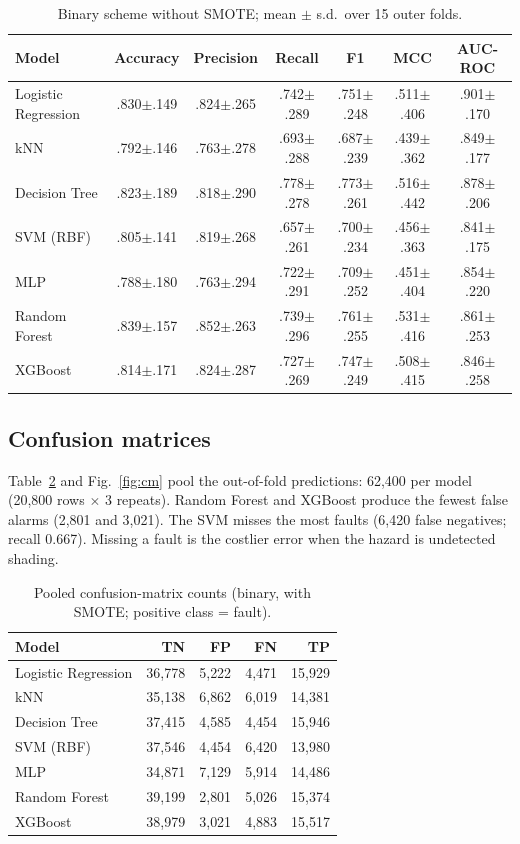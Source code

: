 \documentclass[11pt,a4paper]{article}
\begin{document}
\begin{table}[t]
\centering
\caption{Binary scheme without SMOTE; mean $\pm$ s.d.\ over 15 outer folds.}
\label{tab:nosmote}
\small
\begin{tabular}{@{}lcccccc@{}}
\toprule
Model & Accuracy & Precision & Recall & F1 & MCC & AUC-ROC \\
\midrule
Logistic Regression & .830$\pm$.149 & .824$\pm$.265 & .742$\pm$.289 & .751$\pm$.248 & .511$\pm$.406 & .901$\pm$.170 \\
kNN & .792$\pm$.146 & .763$\pm$.278 & .693$\pm$.288 & .687$\pm$.239 & .439$\pm$.362 & .849$\pm$.177 \\
Decision Tree & .823$\pm$.189 & .818$\pm$.290 & .778$\pm$.278 & .773$\pm$.261 & .516$\pm$.442 & .878$\pm$.206 \\
SVM (RBF) & .805$\pm$.141 & .819$\pm$.268 & .657$\pm$.261 & .700$\pm$.234 & .456$\pm$.363 & .841$\pm$.175 \\
MLP & .788$\pm$.180 & .763$\pm$.294 & .722$\pm$.291 & .709$\pm$.252 & .451$\pm$.404 & .854$\pm$.220 \\
Random Forest & .839$\pm$.157 & .852$\pm$.263 & .739$\pm$.296 & .761$\pm$.255 & .531$\pm$.416 & .861$\pm$.253 \\
XGBoost & .814$\pm$.171 & .824$\pm$.287 & .727$\pm$.269 & .747$\pm$.249 & .508$\pm$.415 & .846$\pm$.258 \\
\bottomrule
\end{tabular}
\end{table}

\subsection{Confusion matrices}

Table~\ref{tab:cm} and Fig.~\ref{fig:cm} pool the out-of-fold predictions: 62{,}400 per model (20{,}800 rows $\times$ 3 repeats). Random Forest and XGBoost produce the fewest false alarms (2{,}801 and 3{,}021). The SVM misses the most faults (6{,}420 false negatives; recall 0.667). Missing a fault is the costlier error when the hazard is undetected shading.

\begin{table}[t]
\centering
\caption{Pooled confusion-matrix counts (binary, with SMOTE; positive class = fault).}
\label{tab:cm}
\small
\begin{tabular}{@{}lrrrr@{}}
\toprule
Model & TN & FP & FN & TP \\
\midrule
Logistic Regression & 36{,}778 & 5{,}222 & 4{,}471 & 15{,}929 \\
kNN & 35{,}138 & 6{,}862 & 6{,}019 & 14{,}381 \\
Decision Tree & 37{,}415 & 4{,}585 & 4{,}454 & 15{,}946 \\
SVM (RBF) & 37{,}546 & 4{,}454 & 6{,}420 & 13{,}980 \\
MLP & 34{,}871 & 7{,}129 & 5{,}914 & 14{,}486 \\
Random Forest & 39{,}199 & 2{,}801 & 5{,}026 & 15{,}374 \\
XGBoost & 38{,}979 & 3{,}021 & 4{,}883 & 15{,}517 \\
\bottomrule
\end{tabular}
\end{table}
\end{document}
